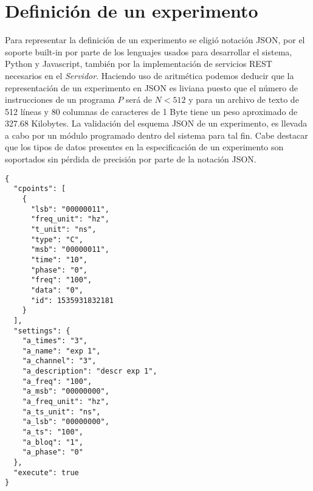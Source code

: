 \section{Definici\'on de un experimento}

Para representar la definici\'on de un experimento se eligi\'o notaci\'on JSON, 
por el soporte built-in por parte de los lenguajes usados para desarrollar el sistema, 
Python y Javascript, tambi\'en por la implementaci\'on de servicios REST necesarios 
en el \textit{Servidor}\cite{json_standar}.
Haciendo uso de aritm\'etica podemos deducir que la representaci\'on de un experimento en JSON
es liviana puesto que el n\'umero de instrucciones de un programa \(P\) ser\'a de \(N < 512 \) 
y para un archivo de texto de 512 l\'ineas y 80 columnas de caracteres de 1 Byte 
tiene un peso aproximado de 327.68 Kilobytes.
La validaci\'on del esquema JSON de un experimento, es llevada a cabo por un m\'odulo programado
dentro del sistema para tal fin.
Cabe destacar que los tipos de datos presentes en la especificaci\'on de un experimento son
soportados sin p\'erdida de precisi\'on por parte de la notaci\'on JSON.\cite{json_ref}


\begin{lstlisting}
{
  "cpoints": [
    {
      "lsb": "00000011",
      "freq_unit": "hz",
      "t_unit": "ns",
      "type": "C",
      "msb": "00000011",
      "time": "10",
      "phase": "0",
      "freq": "100",
      "data": "0",
      "id": 1535931832181
    }
  ],
  "settings": {
    "a_times": "3",
    "a_name": "exp 1",
    "a_channel": "3",
    "a_description": "descr exp 1",
    "a_freq": "100",
    "a_msb": "00000000",
    "a_freq_unit": "hz",
    "a_ts_unit": "ns",
    "a_lsb": "00000000",
    "a_ts": "100",
    "a_bloq": "1",
    "a_phase": "0"
  },
  "execute": true
}
\end{lstlisting}

\newpage


